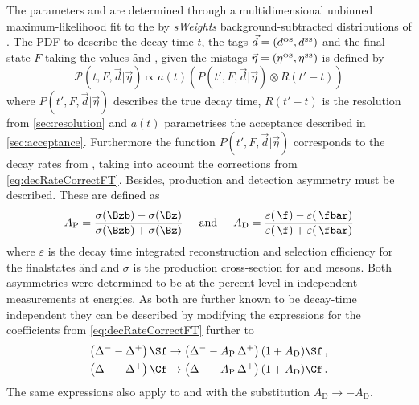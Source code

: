 The \CP parameters \Sf and \Sfbar are determined through a multidimensional unbinned maximum-likelihood fit to the by \emph{sWeights} background-subtracted distributions of \BdToDpi.
The PDF to describe the decay time $t$, the tags $\vec{d}=(d^{\text{\tiny OS}}, d^{\text{\tiny SS}})$ and the final state $F$ taking the values \f and \fbar, given the mistags $\vec{\eta}=(\eta^{\text{\tiny OS}}, \eta^{\text{\tiny SS}})$ is defined by
\begin{equation}
\mathcal{P}(t, F, \vec{d}|\vec{\eta})\propto a(t)\left(P(t', F, \vec{d}|\vec{\eta})\otimes R(t'-t)\right)\label{eq:FinalDecayTimePDF}
\end{equation}
where $P(t', F, \vec{d}|\vec{\eta})$ describes the true decay time, $R(t'-t)$ is the resolution from \cref{sec:resolution} and $a(t)$ parametrises the acceptance described in \cref{sec:acceptance}.
Furthermore the function $P(t', F, \vec{d}|\vec{\eta})$ corresponds to the decay rates from , taking into account the corrections from \cref{eq:decRateCorrectFT}.
Besides, production and detection asymmetry must be described.
These are defined as
\begin{equation}
A_{\text{P}}=\frac{\sigma(\Bzb)-\sigma(\Bz)}{\sigma(\Bzb)+\sigma(\Bz)}\hspace{0.5cm}\text{and}\hspace{0.5cm}A_{\text{D}}=\frac{\varepsilon(\,\f)-\varepsilon(\,\fbar)}{\varepsilon(\,\f)+\varepsilon(\,\fbar)}
\end{equation}
where $\varepsilon$ is the decay time integrated reconstruction and selection efficiency for the finalstates \f and \fbar and $\sigma$ is the production cross-section for \Bz and \Bzb mesons.
Both asymmetries were determined to be at the percent level in independent measurements at \lhc energies.
As both are further known to be decay-time independent they can be described by modifying the expressions for the \CP coefficients from \cref{eq:decRateCorrectFT} further to
\begin{equation}
\begin{aligned}
\left(\Delta^--\Delta^+\right)\Sf&\to\left(\Delta^--A_{\text{P}}\,\Delta^+\right)(1+A_{\text{D}})\Sf\,,\\
\left(\Delta^--\Delta^+\right)\Cf&\to\left(\Delta^--A_{\text{P}}\,\Delta^+\right)(1+A_{\text{D}})\Cf\,.
\end{aligned}
\end{equation}
The same expressions also apply to \Sfbar and \Cfbar with the substitution $A_{\text{D}}\to -A_{\text{D}}$.

